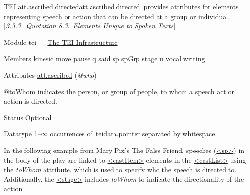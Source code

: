 \begin{reflist}
\item[]\begin{specHead}{TEI.att.ascribed.directed}{att.ascribed.directed} provides attributes for elements representing speech or action that can be directed at a group or individual. [\textit{\hyperref[COHQQ]{3.3.3.\ Quotation}} \textit{\hyperref[TSBA]{8.3.\ Elements Unique to Spoken Texts}}]\end{specHead} 
    \item[{Module}]
  tei — \hyperref[ST]{The TEI Infrastructure}
    \item[{Members}]
  \hyperref[TEI.kinesic]{kinesic} \hyperref[TEI.move]{move} \hyperref[TEI.pause]{pause} \hyperref[TEI.q]{q} \hyperref[TEI.said]{said} \hyperref[TEI.sp]{sp} \hyperref[TEI.spGrp]{spGrp} \hyperref[TEI.stage]{stage} \hyperref[TEI.u]{u} \hyperref[TEI.vocal]{vocal} \hyperref[TEI.writing]{writing}
    \item[{Attributes}]
  \hyperref[TEI.att.ascribed]{att.ascribed} (\textit{@who}) \hfil\\[-10pt]\begin{sansreflist}
    \item[@toWhom]
  indicates the person, or group of people, to whom a speech act or action is directed.
\begin{reflist}
    \item[{Status}]
  Optional
    \item[{Datatype}]
  1–∞ occurrences of \hyperref[TEI.teidata.pointer]{teidata.pointer} separated by whitespace
    \item[]In the following example from Mary Pix's The False Friend, speeches (\hyperref[TEI.sp]{<sp>}) in the body of the play are linked to \hyperref[TEI.castItem]{<castItem>} elements in the \hyperref[TEI.castList]{<castList>} using the {\itshape toWhom} attribute, which is used to specify who the speech is directed to. Additionally, the \hyperref[TEI.stage]{<stage>} includes {\itshape toWhom} to indicate the directionality of the action.\mbox{}\newline 

\end{reflist}
\end{sansreflist}
\end{reflist}
